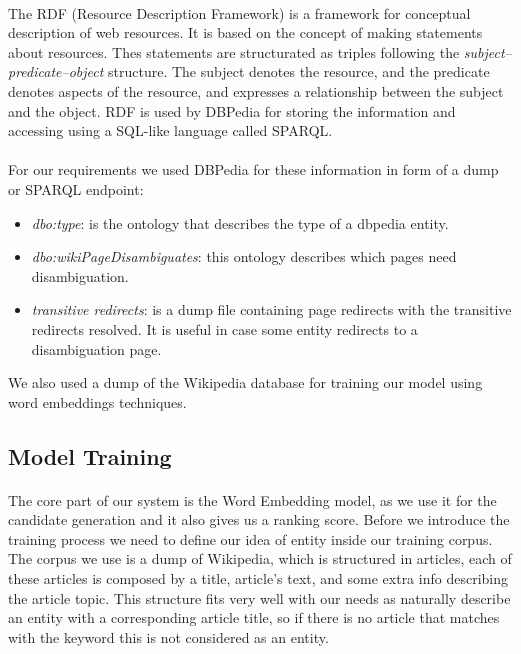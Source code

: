 \paragraph{}
The RDF (Resource Description Framework) is a framework for conceptual description of web resources. It is based on the concept of making statements about resources. Thes statements are structurated as triples following the \textit{subject–predicate–object} structure. The subject denotes the resource, and the predicate denotes aspects of the resource, and expresses a relationship between the subject and the object. RDF is used by DBPedia for storing the information and accessing using a SQL-like language called SPARQL.

\paragraph{}
For our requirements we used DBPedia for these information in form of a dump or SPARQL endpoint:

\begin{itemize}[itemsep = 0.1em]
\item \textit{dbo:type}: is the ontology that describes the type of a dbpedia entity.
\item \textit{dbo:wikiPageDisambiguates}: this ontology describes which pages need disambiguation.
\item \textit{transitive redirects}: is a dump file containing page redirects with the transitive redirects resolved. It is useful in case some entity redirects to a disambiguation page.
\end{itemize} 
We also used a dump of the Wikipedia database for training our model using word embeddings techniques.

\subsection{Model Training}
\paragraph{}
The core part of our system is the Word Embedding model, as we use it for the candidate generation and it also gives us a ranking score. Before we introduce the training process we need to define our idea of entity inside our training corpus. The corpus we use is a dump of Wikipedia, which is structured in articles, each of these articles is composed by a title, article's text, and some extra info describing the article topic. This structure fits very well with our needs as naturally describe an entity with a corresponding article title, so if there is no article that matches with the keyword this is not considered as an entity.

